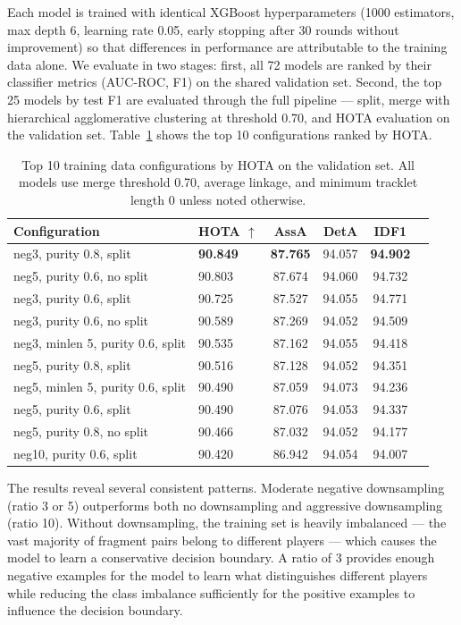 Each model is trained with identical XGBoost hyperparameters (1000 estimators, max depth 6, learning rate 0.05, early stopping after 30 rounds without improvement) so that differences in performance are attributable to the training data alone. We evaluate in two stages: first, all 72 models are ranked by their classifier metrics (AUC-ROC, F1) on the shared validation set. Second, the top 25 models by test F1 are evaluated through the full pipeline --- split, merge with hierarchical agglomerative clustering at threshold 0.70, and HOTA evaluation on the validation set. Table~\ref{tab:sweep_hota_top10} shows the top 10 configurations ranked by HOTA.

\begin{table}[H]
\centering
\begin{tabular}{llcccc}
\toprule
\textbf{Configuration} & \textbf{HOTA $\uparrow$} & \textbf{AssA} & \textbf{DetA} & \textbf{IDF1} \\
\midrule
neg3, purity 0.8, split     & \textbf{90.849} & \textbf{87.765} & 94.057 & \textbf{94.902} \\
neg5, purity 0.6, no split  & 90.803 & 87.674 & 94.060 & 94.732 \\
neg3, purity 0.6, split     & 90.725 & 87.527 & 94.055 & 94.771 \\
neg3, purity 0.6, no split  & 90.589 & 87.269 & 94.052 & 94.509 \\
neg3, minlen 5, purity 0.6, split & 90.535 & 87.162 & 94.055 & 94.418 \\
neg5, purity 0.8, split     & 90.516 & 87.128 & 94.052 & 94.351 \\
neg5, minlen 5, purity 0.6, split & 90.490 & 87.059 & 94.073 & 94.236 \\
neg5, purity 0.6, split     & 90.490 & 87.076 & 94.053 & 94.337 \\
neg5, purity 0.8, no split  & 90.466 & 87.032 & 94.052 & 94.177 \\
neg10, purity 0.6, split    & 90.420 & 86.942 & 94.054 & 94.007 \\
\bottomrule
\end{tabular}
\caption{Top 10 training data configurations by HOTA on the validation set. All models use merge threshold 0.70, average linkage, and minimum tracklet length 0 unless noted otherwise.}
\label{tab:sweep_hota_top10}
\end{table}

The results reveal several consistent patterns. Moderate negative downsampling (ratio 3 or 5) outperforms both no downsampling and aggressive downsampling (ratio 10). Without downsampling, the training set is heavily imbalanced --- the vast majority of fragment pairs belong to different players --- which causes the model to learn a conservative decision boundary. A ratio of 3 provides enough negative examples for the model to learn what distinguishes different players while reducing the class imbalance sufficiently for the positive examples to influence the decision boundary.

